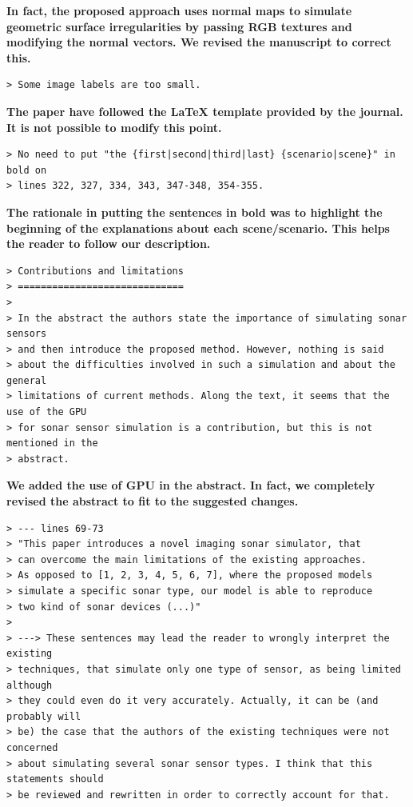 \documentclass{article}
\begin{document}
\textbf{In fact, the proposed approach uses normal maps to simulate geometric surface irregularities by passing RGB textures and modifying the normal vectors. We revised the manuscript to correct this.}

\begin{verbatim}
> Some image labels are too small.
\end{verbatim}

\textbf{The paper have followed the LaTeX template provided by the journal. It is not possible to modify this point.}

\begin{verbatim}
> No need to put "the {first|second|third|last} {scenario|scene}" in bold on
> lines 322, 327, 334, 343, 347-348, 354-355.
\end{verbatim}

\textbf{The rationale in putting the sentences in bold was to highlight the beginning of the explanations about each scene/scenario. This helps the reader to follow our description.}

\begin{verbatim}
> Contributions and limitations
> =============================
>
> In the abstract the authors state the importance of simulating sonar sensors
> and then introduce the proposed method. However, nothing is said
> about the difficulties involved in such a simulation and about the general
> limitations of current methods. Along the text, it seems that the use of the GPU
> for sonar sensor simulation is a contribution, but this is not mentioned in the
> abstract.
\end{verbatim}

\textbf{We added the use of GPU in the abstract. In fact, we completely revised the abstract to fit to the suggested changes.}


\begin{verbatim}
> --- lines 69-73
> "This paper introduces a novel imaging sonar simulator, that
> can overcome the main limitations of the existing approaches.
> As opposed to [1, 2, 3, 4, 5, 6, 7], where the proposed models
> simulate a specific sonar type, our model is able to reproduce
> two kind of sonar devices (...)"
>
> ---> These sentences may lead the reader to wrongly interpret the existing
> techniques, that simulate only one type of sensor, as being limited although
> they could even do it very accurately. Actually, it can be (and probably will
> be) the case that the authors of the existing techniques were not concerned
> about simulating several sonar sensor types. I think that this statements should
> be reviewed and rewritten in order to correctly account for that.
\end{verbatim}
\end{document}

